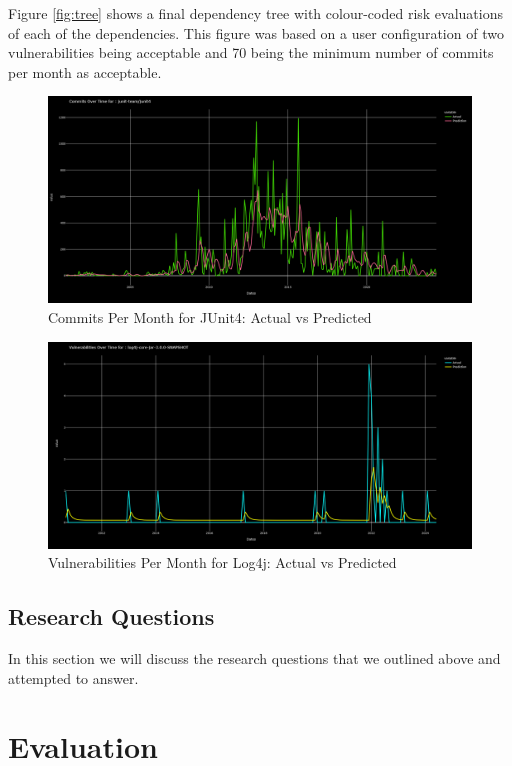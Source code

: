 \documentclass[10pt, compsoc, conference]{IEEEtran}
\begin{document}
Figure \ref{fig:tree} shows a final dependency tree with colour-coded risk evaluations of each of the dependencies. This figure was based on a user configuration of two vulnerabilities being acceptable and 70 being the minimum number of commits per month as acceptable. 

\begin{figure}
    \centering
    \includegraphics[width=1\linewidth]{JUnit4-commits.png}
    \caption{Commits Per Month for JUnit4: Actual vs Predicted} 
    \label{fig:commits}
\end{figure}

\begin{figure}
    \centering
    \includegraphics[width=1\linewidth]{Log4j-Vulns.png}
    \caption{Vulnerabilities Per Month for Log4j: Actual vs Predicted} 
    \label{fig:vulns}
\end{figure}

\subsection{Research Questions}
In this section we will discuss the research questions that we outlined above and attempted to answer. 

\section{Evaluation}
\end{document}
